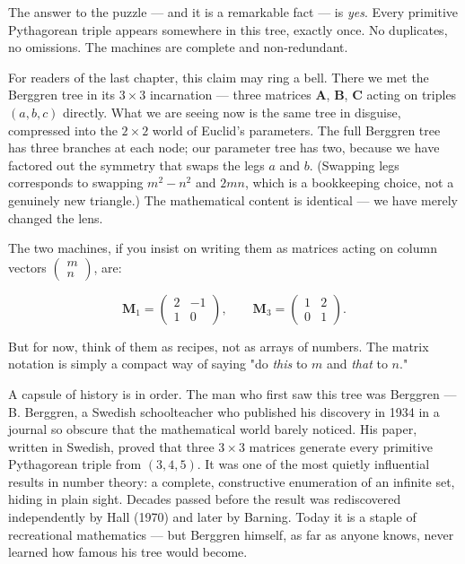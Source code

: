 \documentclass[11pt,openright,twoside]{book}
\theoremstyle{definition}
\begin{document}
The answer to the puzzle --- and it is a remarkable fact --- is \textit{yes}. Every primitive Pythagorean triple appears somewhere in this tree, exactly once. No duplicates, no omissions. The machines are complete and non-redundant.

For readers of the last chapter, this claim may ring a bell. There we met the Berggren tree in its $3 \times 3$ incarnation --- three matrices $\mathbf{A}$, $\mathbf{B}$, $\mathbf{C}$ acting on triples $(a, b, c)$ directly. What we are seeing now is the same tree in disguise, compressed into the $2 \times 2$ world of Euclid's parameters. The full Berggren tree has three branches at each node; our parameter tree has two, because we have factored out the symmetry that swaps the legs $a$ and $b$. (Swapping legs corresponds to swapping $m^2 - n^2$ and $2mn$, which is a bookkeeping choice, not a genuinely new triangle.) The mathematical content is identical --- we have merely changed the lens.

The two machines, if you insist on writing them as matrices acting on column vectors $\begin{pmatrix} m \\ n \end{pmatrix}$, are:

\[
\mathbf{M}_1 = \begin{pmatrix} 2 & -1 \\ 1 & 0 \end{pmatrix}, \qquad
\mathbf{M}_3 = \begin{pmatrix} 1 & 2 \\ 0 & 1 \end{pmatrix}.
\]

But for now, think of them as recipes, not as arrays of numbers. The matrix notation is simply a compact way of saying "do \textit{this} to $m$ and \textit{that} to $n$."

A capsule of history is in order. The man who first saw this tree was Berggren --- B. Berggren, a Swedish schoolteacher who published his discovery in 1934 in a journal so obscure that the mathematical world barely noticed. His paper, written in Swedish, proved that three $3 \times 3$ matrices generate every primitive Pythagorean triple from $(3, 4, 5)$. It was one of the most quietly influential results in number theory: a complete, constructive enumeration of an infinite set, hiding in plain sight. Decades passed before the result was rediscovered independently by Hall (1970) and later by Barning. Today it is a staple of recreational mathematics --- but Berggren himself, as far as anyone knows, never learned how famous his tree would become.
\end{document}
